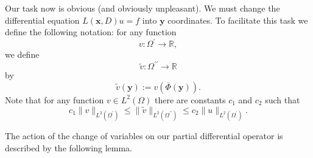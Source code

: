 Our task now is obvious (and obviously unpleasant). We must change the differential equation $L(\bm{x},D)u=f$ into $\bm{y}$ coordinates. To facilitate this task we define the following notation: for any function\[v:\Omega^{\prime}\to\mathbb{R},\]we define
\begin{equation}\label{eq:boundary-coordinate-transformed-function-domain}
\widetilde v:\Omega^{\prime\prime}\to\mathbb{R}
\end{equation}
by
\begin{equation}\label{eq:boundary-coordinate-transformed-function-definition}
\widetilde v(\bm{y}):=v(\overline\Phi(\bm{y})).
\end{equation}
Note that for any function $v\in L^2(\Omega)$ there are constants $c_1$ and $c_2$ such that
\begin{equation}\label{eq:boundary-coordinate-l2-norm-comparison}
c_1\|v\|_{L^2(\Omega^{\prime})}\leq\|\widetilde v\|_{L^2(\Omega^{\prime\prime})}\leq c_2\|u\|_{L^2(\Omega^{\prime})}.
\end{equation}


The action of the change of variables on our partial differential operator is described by the following lemma.

